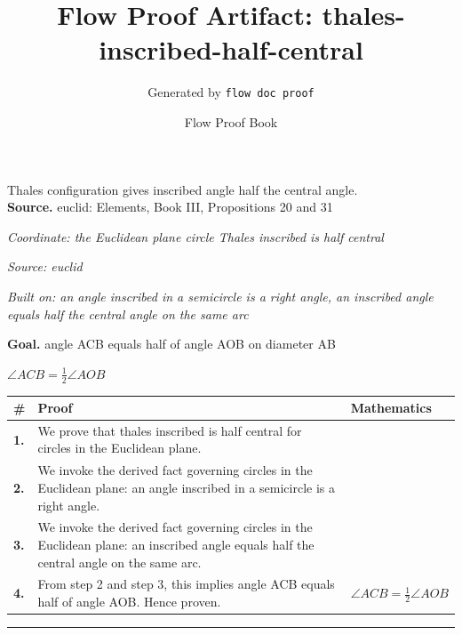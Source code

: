 \documentclass[11pt]{article}
\title{Flow Proof Artifact: thales-inscribed-half-central}
\author{Generated by \texttt{flow doc proof}}
\date{Flow Proof Book}
\theoremstyle{definition}
\begin{document}
\maketitle
Thales configuration gives inscribed angle half the central angle.\\[0.5em]
\textbf{Source.} euclid: Elements, Book III, Propositions 20 and 31\\[0.5em]
\bigskip
{}\par
\smallskip\noindent\textit{Coordinate: the Euclidean plane \cdot circle \cdot Thales inscribed is half central}\par
\smallskip\noindent\textit{Source: euclid}\par
\smallskip\noindent\textit{Built on: an angle inscribed in a semicircle is a right angle, an inscribed angle equals half the central angle on the same arc}\par
\medskip
\noindent\textbf{Goal.} angle ACB equals half of angle AOB on diameter AB\par
\noindent$\displaystyle \angle ACB = \tfrac{1}{2}\angle AOB$\par
\medskip
\noindent
\begin{tabular}{@{} >{\raggedright\arraybackslash}p{} >{\raggedright\arraybackslash}p{} >{\raggedleft\arraybackslash}p{} @{}}
\textbf{\#} & \textbf{Proof} & \textbf{Mathematics} \\
\midrule
\textbf{1.} & We prove that thales inscribed is half central for circles in the Euclidean plane. & \\[0.45em]
\textbf{2.} & We invoke the derived fact governing circles in the Euclidean plane: an angle inscribed in a semicircle is a right angle. & \\[0.45em]
\textbf{3.} & We invoke the derived fact governing circles in the Euclidean plane: an inscribed angle equals half the central angle on the same arc. & \\[0.45em]
\textbf{4.} & From step 2 and step 3, this implies angle ACB equals half of angle AOB. Hence proven. & $\displaystyle \angle ACB = \tfrac{1}{2}\angle AOB$ \\[0.45em]
\bottomrule
\end{tabular}
\label{thm:Geometry-circle-thales_inscribed_is_half_central}
\par\medskip\hrule
\end{document}

